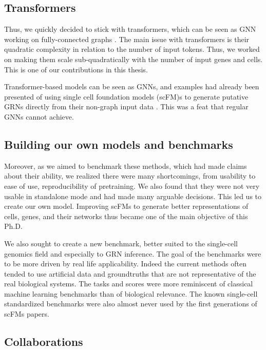 \subsection{Transformers}

Thus, we quickly decided to stick with transformers, which can be seen as \gls{GNN} working on fully-connected graphs \cite{dwivediGeneralizationTransformerNetworks2021,joshiTransformersAreGraph2025,nichaniHowTransformersLearn2024a,shawSelfAttentionRelativePosition2018}. The main issue with transformers is their quadratic complexity in relation to the number of input tokens. Thus, we worked on making them scale sub-quadratically with the number of input genes and cells. This is one of our contributions in this thesis.

Transformer-based models can be seen as \gls{GNN}s, and examples had already been presented of using single cell foundation models (\gls{scFM})s to generate putative \gls{GRN}s directly from their non-graph input data \cite{cuiScGPTBuildingFoundation2024,theodorisTransferLearningEnables2023}. This was a feat that regular \gls{GNN}s cannot achieve.

\subsection{Building our own models and benchmarks}

Moreover, as we aimed to benchmark these methods, which had made claims about their ability, we realized there were many shortcomings, from usability to ease of use, reproducibility of pretraining. We also found that they were not very usable in standalone mode and had made many arguable decisions. This led us to create our own model. Improving \gls{scFM}s to generate better representations of cells, genes, and their networks thus became one of the main objective of this Ph.D.

We also sought to create a new benchmark, better suited to the single-cell genomics field and especially to \gls{GRN} inference. The goal of the benchmarks were to be more driven by real life applicability. Indeed the current methods often tended to use artificial data and groundtruths that are not representative of the real biological systems. The tasks and scores were more reminiscent of classical machine learning benchmarks than of biological relevance. The known single-cell standardized benchmarks were also almost never used by the first generations of \gls{scFM}s papers.

\subsection{Collaborations}

